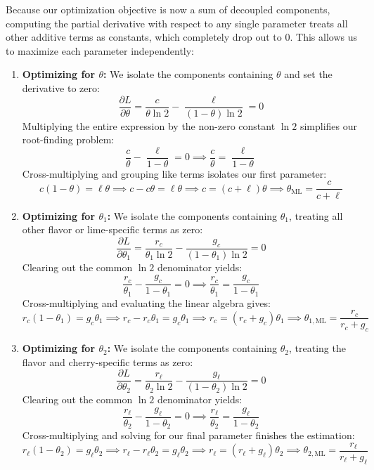 Because our optimization objective is now a sum of decoupled components, computing the partial derivative with respect to any single parameter treats all other additive terms as constants, which completely drop out to $0$. This allows us to maximize each parameter independently:

\begin{enumerate}
    \item \textbf{Optimizing for $\theta$:}
    We isolate the components containing $\theta$ and set the derivative to zero:
    \[
    \frac{\partial L}{\partial \theta} = \frac{c}{\theta \ln 2} - \frac{\ell}{(1-\theta)\ln 2} = 0
    \]
    Multiplying the entire expression by the non-zero constant $\ln 2$ simplifies our root-finding problem:
    \[
    \frac{c}{\theta} - \frac{\ell}{1-\theta} = 0 \implies \frac{c}{\theta} = \frac{\ell}{1-\theta}
    \]
    Cross-multiplying and grouping like terms isolates our first parameter:
    \[
    c(1-\theta) = \ell\theta \implies c - c\theta = \ell\theta \implies c = (c+\ell)\theta \implies \theta_{\text{ML}} = \frac{c}{c + \ell}
    \]

    \item \textbf{Optimizing for $\theta_1$:}
    We isolate the components containing $\theta_1$, treating all other flavor or lime-specific terms as zero:
    \[
    \frac{\partial L}{\partial \theta_1} = \frac{r_c}{\theta_1 \ln 2} - \frac{g_c}{(1-\theta_1)\ln 2} = 0
    \]
    Clearing out the common $\ln 2$ denominator yields:
    \[
    \frac{r_c}{\theta_1} - \frac{g_c}{1-\theta_1} = 0 \implies \frac{r_c}{\theta_1} = \frac{g_c}{1-\theta_1}
    \]
    Cross-multiplying and evaluating the linear algebra gives:
    \[
    r_c(1-\theta_1) = g_c\theta_1 \implies r_c - r_c\theta_1 = g_c\theta_1 \implies r_c = (r_c+g_c)\theta_1 \implies \theta_{1,\text{ML}} = \frac{r_c}{r_c + g_c}
    \]

    \item \textbf{Optimizing for $\theta_2$:}
    We isolate the components containing $\theta_2$, treating the flavor and cherry-specific terms as zero:
    \[
    \frac{\partial L}{\partial \theta_2} = \frac{r_{\ell}}{\theta_2 \ln 2} - \frac{g_{\ell}}{(1-\theta_2)\ln 2} = 0
    \]
    Clearing out the common $\ln 2$ denominator yields:
    \[
    \frac{r_{\ell}}{\theta_2} - \frac{g_{\ell}}{1-\theta_2} = 0 \implies \frac{r_{\ell}}{\theta_2} = \frac{g_{\ell}}{1-\theta_2}
    \]
    Cross-multiplying and solving for our final parameter finishes the estimation:
    \[
    r_{\ell}(1-\theta_2) = g_{\ell}\theta_2 \implies r_{\ell} - r_{\ell}\theta_2 = g_{\ell}\theta_2 \implies r_{\ell} = (r_{\ell}+g_{\ell})\theta_2 \implies \theta_{2,\text{ML}} = \frac{r_{\ell}}{r_{\ell} + g_{\ell}}
    \]
\end{enumerate}


